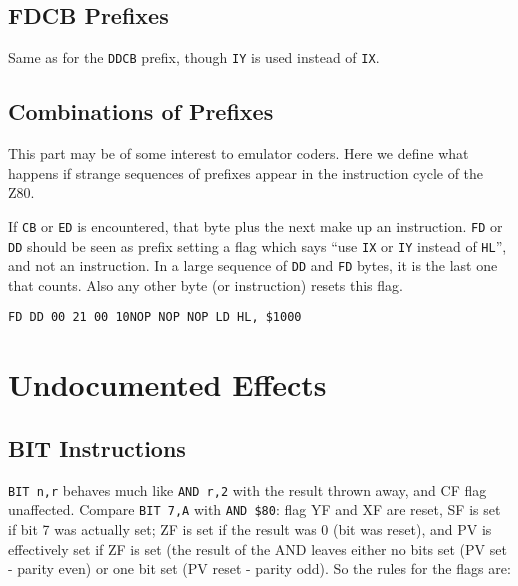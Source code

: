 \pagebreak
\subsection{FDCB Prefixes}

Same as for the {\tt DDCB} prefix, though {\tt IY} is used instead of {\tt IX}.


\subsection{Combinations of Prefixes}

This part may be of some interest to emulator coders. Here we define what happens if strange sequences of prefixes appear in the instruction cycle of the Z80.

If {\tt CB} or {\tt ED} is encountered, that byte plus the next make up an instruction. {\tt FD} or {\tt DD} should be seen as prefix setting a flag which says ``use {\tt IX} or {\tt IY} instead of {\tt HL}'', and not an instruction. In a large sequence of {\tt DD} and {\tt FD} bytes, it is the last one that counts. Also any other byte (or instruction) resets this flag.

{\tt {\qquad}FD DD 00 21 00 10{\qquad}NOP NOP NOP LD HL, \$1000}




\section{Undocumented Effects}

\subsection{BIT Instructions}
\label{bit_flags}

{\tt BIT n,r} behaves much like {\tt AND r,2{\raisebox{1ex}{n}}} with the result thrown away, and CF flag unaffected. Compare {\tt BIT 7,A} with {\tt AND \$80}: flag YF and XF are reset, SF is set if bit 7 was actually set; ZF is set if the result was 0 (bit was reset), and PV is effectively set if ZF is set (the result of the AND leaves either no bits set (PV set - parity even) or one bit set (PV reset - parity odd). So the rules for the flags are:

